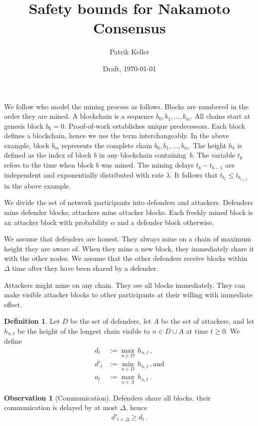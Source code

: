 \documentclass{article}
\theoremstyle{definition}
\newtheorem{definition}{Definition}
\newtheorem{observation}{Observation}
\begin{document}
\title{Safety bounds for Nakamoto Consensus}
\author{Patrik Keller}
\date{Draft, \today}
\maketitle

We follow \citet{guo2022BitcoinLatency} who model the mining process as follows.
Blocks are numbered in the order they are mined.
A blockchain is a sequence $b_0, b_1, \dots, b_m$.
All chains start at genesis block $b_0 = 0$.
Proof-of-work establishes unique predecessors.
Each block defines a blockchain, hence we use the term interchangeably.
In the above example, block $b_m$ represents the complete chain $b_0, b_1, \dots, b_m$.
The height $h_b$ is defined as the index of block $b$ in any blockchain containing~$b$.
%
The variable $t_b$ refers to the time when block $b$ was mined.
The mining delays $t_b - t_{b-1}$ are independent and exponentially distributed with rate $\lambda$.
It follows that $t_{b_i} \leq t_{b_{i+1}}$ in the above example.

We divide the set of network participants into defenders and attackers.
Defenders mine defender blocks; attackers mine attacker blocks.
Each freshly mined block is an attacker block with probability $\alpha$ and a defender block otherwise.

We assume that defenders are honest.
They always mine on a chain of maximum height they are aware of.
When they mine a new block, they immediately share it with the other nodes.
We assume that the other defenders receive blocks within $\Delta$ time after they have been shared by a defender.

Attackers might mine on any chain.
They see all blocks immediately.
They can make visible attacker blocks to other participants at their willing with immediate effect.

\begin{definition}
  Let $D$ be the set of defenders,
  let $A$ be the set of attackers, and
  let $h_{n,t}$ be the height of the longest chain visible to $n \in D \cup A$ at time $t \geq 0$.
  We define
  \begin{align}
    d_t & := \max_{n \in D} \, h_{n, t} \,,\\
    d'_t & := \min_{n \in D} \, h_{n, t} \,, \text{and}\\
    a_t & := \max_{n \in A} \, h_{n, t} \,.
  \end{align}
\end{definition}

\begin{observation}[Communication]
  Defenders share all blocks, their communication is delayed by at most $\Delta$, hence
  \begin{align}
    d'_{t + \Delta} \geq d_t \,.
  \end{align}
\end{observation}
\end{document}
